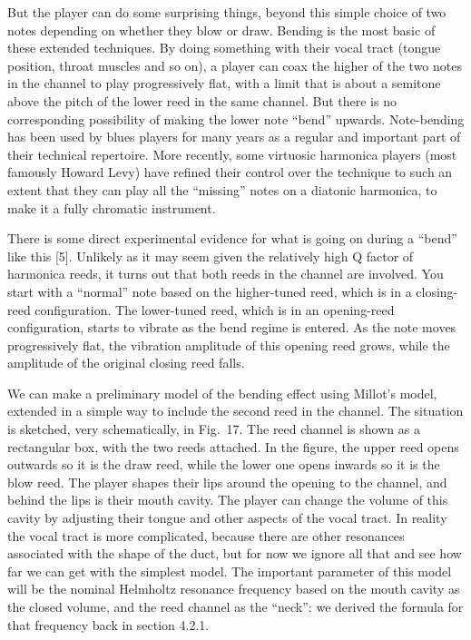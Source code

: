   But the player can do some surprising things, beyond this simple choice of 
  two notes depending on whether they blow or draw. Bending is the most basic 
  of these extended techniques. By doing something with their vocal tract 
  (tongue position, throat muscles and so on), a player can coax the higher of 
  the two notes in the channel to play progressively flat, with a limit that is 
  about a semitone above the pitch of the lower reed in the same channel. But 
  there is no corresponding possibility of making the lower note “bend” 
  upwards. Note-bending has been used by blues players for many years as a 
  regular and important part of their technical repertoire. More recently, some 
  virtuosic harmonica players (most famously Howard Levy) have refined their 
  control over the technique to such an extent that they can play all the 
  “missing” notes on a diatonic harmonica, to make it a fully chromatic 
  instrument. 

  There is some direct experimental evidence for what is going on during a 
  “bend” like this [5]. Unlikely as it may seem given the relatively high Q 
  factor of harmonica reeds, it turns out that both reeds in the channel are 
  involved. You start with a ``normal'' note based on the higher-tuned reed, 
  which is in a closing-reed configuration. The lower-tuned reed, which is in 
  an opening-reed configuration, starts to vibrate as the bend regime is 
  entered. As the note moves progressively flat, the vibration amplitude of 
  this opening reed grows, while the amplitude of the original closing reed 
  falls. 

  We can make a preliminary model of the bending effect using Millot’s model, 
  extended in a simple way to include the second reed in the channel. The 
  situation is sketched, very schematically, in Fig.\ 17. The reed channel is 
  shown as a rectangular box, with the two reeds attached. In the figure, the 
  upper reed opens outwards so it is the draw reed, while the lower one opens 
  inwards so it is the blow reed. The player shapes their lips around the 
  opening to the channel, and behind the lips is their mouth cavity. The player 
  can change the volume of this cavity by adjusting their tongue and other 
  aspects of the vocal tract. In reality the vocal tract is more complicated, 
  because there are other resonances associated with the shape of the duct, but 
  for now we ignore all that and see how far we can get with the simplest 
  model. The important parameter of this model will be the nominal Helmholtz 
  resonance frequency based on the mouth cavity as the closed volume, and the 
  reed channel as the “neck”: we derived the formula for that frequency back in 
  section 4.2.1. 

